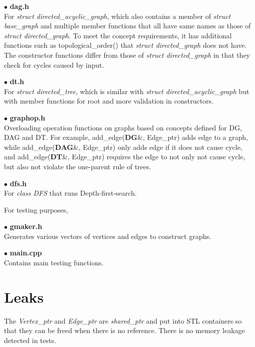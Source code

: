 \documentclass[11pt, oneside]{article}   	%
\begin{document}
$\bullet$ \textbf{dag.h}\\
For \textit{struct directed\_acyclic\_graph}, which also contains a member of \textit{struct base\_graph} and multiple member functions that all have same names as those of \textit{struct directed\_graph}. To meet the concept requirements, it has additional functions such as topological\_order() that \textit{struct directed\_graph} does not have. The constructor functions differ from those of \textit{struct directed\_graph} in that they check for cycles caused by input.

$\bullet$ \textbf{dt.h}\\
For \textit{struct directed\_tree}, which is similar with \textit{struct directed\_acyclic\_graph} but with member functions for root and more validation in constructors.

$\bullet$ \textbf{graphop.h}\\
Overloading operation functions on graphs based on concepts defined for DG, DAG and DT. For example, add\_edge(\textbf{DG}\&, Edge\_ptr) adds edge to a graph, while add\_edge(\textbf{DAG}\&, Edge\_ptr) only adds edge if it does not cause cycle, and add\_edge(\textbf{DT}\&, Edge\_ptr) requires the edge to not only not cause cycle, but also not violate the one-parent rule of trees.

$\bullet$ \textbf{dfs.h}\\
For \textit{class DFS} that runs Depth-first-search.

For testing purposes,

$\bullet$ \textbf{gmaker.h}\\
Generates various vectors of vertices and edges to construct graphs.

$\bullet$ \textbf{main.cpp}\\
Contains main testing functions.

\section*{Leaks}

The \textit{Vertex\_ptr} and \textit{Edge\_ptr} are \textit{shared\_ptr} and put into STL containers so that they can be freed when there is no reference. There is no memory leakage detected in tests.
\end{document}
